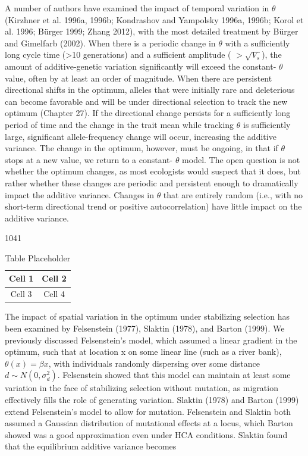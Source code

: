 \documentclass{article}
\begin{document}
A number of authors have examined the impact of temporal variation in  $ \theta $ (Kirzhner et al. 1996a, 1996b; Kondrashov and Yampolsky 1996a, 1996b; Korol et al. 1996; Bürger 1999; Zhang 2012), with the most detailed treatment by Bürger and Gimelfarb (2002). When there is a periodic change in  $ \theta $ with a sufficiently long cycle time (>10 generations) and a sufficient amplitude ( $ >\sqrt{V_s} $), the amount of additive-genetic variation significantly will exceed the constant- $ \theta $ value, often by at least an order of magnitude. When there are persistent directional shifts in the optimum, alleles that were initially rare and deleterious can become favorable and will be under directional selection to track the new optimum (Chapter 27). If the directional change persists for a sufficiently long period of time and the change in the trait mean while tracking  $ \theta $ is sufficiently large, significant allele-frequency change will occur, increasing the additive variance. The change in the optimum, however, must be ongoing, in that if  $ \theta $ stops at a new value, we return to a constant- $ \theta $ model. The open question is not whether the optimum changes, as most ecologists would suspect that it does, but rather whether these changes are periodic and persistent enough to dramatically impact the additive variance. Changes in  $ \theta $ that are entirely random (i.e., with no short-term directional trend or positive autocorrelation) have little impact on the additive variance.

1041

\begin{table}[h]
\centering
\begin{tabular}{|c|c|}
\hline
Cell 1 & Cell 2 \\
\hline
Cell 3 & Cell 4 \\
\hline
\end{tabular}
\caption{Table Placeholder}
\end{table}

The impact of spatial variation in the optimum under stabilizing selection has been examined by Felsenstein (1977), Slaktin (1978), and Barton (1999). We previously discussed Felsenstein's model, which assumed a linear gradient in the optimum, such that at location x on some linear line (such as a river bank),  $ \theta(x) = \beta x $, with individuals randomly dispersing over some distance  $ d \sim N(0, \sigma_d^2) $. Felsenstein showed that this model can maintain at least some variation in the face of stabilizing selection without mutation, as migration effectively fills the role of generating variation. Slaktin (1978) and Barton (1999) extend Felsenstein's model to allow for mutation. Felsenstein and Slaktin both assumed a Gaussian distribution of mutational effects at a locus, which Barton showed was a good approximation even under HCA conditions. Slaktin found that the equilibrium additive variance becomes
\end{document}
